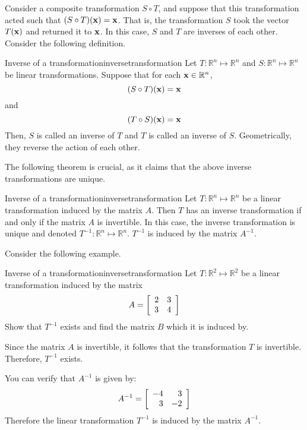 Consider a composite transformation $S \circ T$, and suppose that this transformation acted such that $(S \circ T) ({\bf x}) = {\bf x}$. That is, the transformation $S$ took the vector $T({\bf x})$ and returned it to ${\bf x}$. In this case, $S$ and $T$ are inverses of each other. Consider the following definition.  

\begin{definition}{Inverse of a transformation}{inversetransformation}
Let $T: \mathbb{R}^n \mapsto \mathbb{R}^n$ and $S:\mathbb{R}^n \mapsto \mathbb{R}^n$ be linear transformations. Suppose that for each ${\bf x} \in \mathbb{R}^n$, 
\[
(S \circ T)({\bf x}) = {\bf x}
\]
and 
\[
(T \circ S)({\bf x}) = {\bf x}
\]
Then, $S$ is called an inverse of $T$  and $T$ is called an inverse of $S$. Geometrically, they reverse the action of each other. 
\end{definition}

The following theorem is crucial, as it claims that the above inverse transformations are unique. 

\begin{theorem}{Inverse of a transformation}{inversetransformation}
Let $T:\mathbb{R}^n \mapsto \mathbb{R}^n$ be a linear transformation induced by the matrix $A$. Then $T$ has an inverse transformation if and only if the matrix $A$ is invertible. In this case, the inverse transformation is unique and denoted $T^{-1}: \mathbb{R}^n \mapsto \mathbb{R}^n$. $T^{-1}$ is induced by the matrix $A^{-1}$. 
\end{theorem}

Consider the following example. 

\begin{example}{Inverse of a transformation}{inversetransformation}
Let $T: \mathbb{R}^2 \mapsto \mathbb{R}^2$ be a linear transformation induced by the matrix 
\[
A = 
\left[
\begin{array}{rr}
2 & 3 \\
3 & 4
\end{array}
\right]
\]
Show that $T^{-1}$ exists and find the matrix $B$ which it is induced by. 
\end{example}

\begin{solution}
Since the matrix $A$ is invertible, it follows that the transformation $T$ is invertible. Therefore, $T^{-1}$ exists. 

You can verify that $A^{-1}$ is given by:
\[
A^{-1}
=
\left[
\begin{array}{rr}
-4 & 3 \\
3 & -2
\end{array}
\right]
\]
Therefore the linear transformation $T^{-1}$ is induced by the matrix $A^{-1}$. 
\end{solution}
